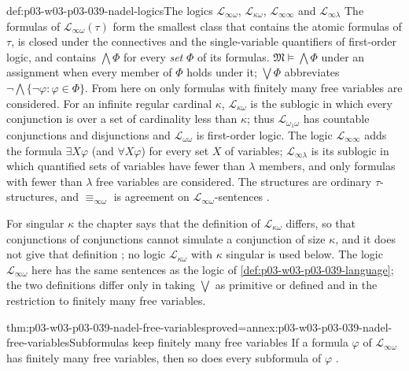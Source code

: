 \begin{hbdefinition}{def:p03-w03-p03-039-nadel-logics}{The logics \(\mathscr L_{\infty\omega}\), \(\mathscr L_{\kappa\omega}\), \(\mathscr L_{\infty\infty}\) and \(\mathscr L_{\infty\lambda}\)}
The formulas of \(\mathscr L_{\infty\omega}(\tau)\) form the smallest class
that contains the atomic formulas of \(\tau\), is closed under the
connectives and the single-variable quantifiers of first-order logic, and
contains \(\bigwedge\Phi\) for every \emph{set} \(\Phi\) of its formulas.
\(\mathfrak M\models\bigwedge\Phi\) under an assignment when every member of
\(\Phi\) holds under it; \(\bigvee\Phi\) abbreviates
\(\neg\bigwedge\{\neg\varphi:\varphi\in\Phi\}\). From here on only formulas
with finitely many free variables are considered. For an infinite regular
cardinal \(\kappa\), \(\mathscr L_{\kappa\omega}\) is the sublogic in which
every conjunction is over a set of cardinality less than \(\kappa\); thus
\(\mathscr L_{\omega_1\omega}\) has countable conjunctions and disjunctions
and \(\mathscr L_{\omega\omega}\) is first-order logic. The logic
\(\mathscr L_{\infty\infty}\) adds the formula \(\exists X\varphi\) (and
\(\forall X\varphi\)) for every set \(X\) of variables;
\(\mathscr L_{\infty\lambda}\) is its sublogic in which quantified sets of
variables have fewer than \(\lambda\) members, and only formulas with fewer
than \(\lambda\) free variables are considered. The structures are ordinary
\(\tau\)-structures, and \(\equiv_{\infty\omega}\) is agreement on
\(\mathscr L_{\infty\omega}\)-sentences
\cite[\S\S~1.2 and~2, pp.~273 and~276]{Nadel1985Admissible}.
\end{hbdefinition}

For singular \(\kappa\) the chapter says that the definition of
\(\mathscr L_{\kappa\omega}\) differs, so that conjunctions of conjunctions
cannot simulate a conjunction of size \(\kappa\), and it does not give that
definition \cite[p.~273]{Nadel1985Admissible}; no logic
\(\mathscr L_{\kappa\omega}\) with \(\kappa\) singular is used below. The
logic \(\mathscr L_{\infty\omega}\) here has the same sentences as the logic
of \cref{def:p03-w03-p03-039-language}; the two definitions differ only in
taking \(\bigvee\) as primitive or defined and in the restriction to finitely
many free variables.

\begin{hblemma}{thm:p03-w03-p03-039-nadel-free-variables}{proved=annex:p03-w03-p03-039-nadel-free-variables}{Subformulas keep finitely many free variables}
If a formula \(\varphi\) of \(\mathscr L_{\infty\omega}\) has finitely many
free variables, then so does every subformula of \(\varphi\)
\cite[p.~273]{Nadel1985Admissible}.
\end{hblemma}


